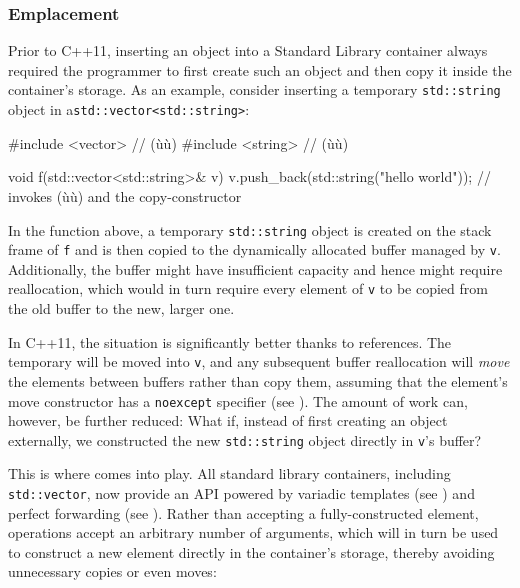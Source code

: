 \subsubsection[Emplacement]{Emplacement}\label{emplacement}

Prior to C++11, inserting an object into a Standard Library container
always required the programmer to first create such an object and then
copy it inside the container's storage. As an example, consider
inserting a temporary \lstinline!std::string! object in a\linebreak[4]
\mbox{\lstinline!std::vector<std::string>!}:

\begin{emcppshiddenlisting}[emcppsbatch=e11]
#include <vector>  // (ù{}ù)
#include <string>  // (ù{}ù)
\end{emcppshiddenlisting}
\begin{emcppslisting}[emcppsbatch=e11]
void f(std::vector<std::string>& v)
{
    v.push_back(std::string("hello world"));
        // invokes (ù{}ù) and the copy-constructor
}
\end{emcppslisting}

\noindent In the function above, a temporary \lstinline!std::string! object is
created on the stack frame of \lstinline!f! and is then copied to the
dynamically allocated buffer managed by \lstinline!v!. Additionally, the
buffer might have insufficient capacity and hence might require
reallocation, which would in turn require every element of \lstinline!v! to
be copied from the old buffer to the new, larger one.

In C++11, the situation is significantly better thanks to
 references. The temporary will be moved into
\lstinline!v!, and any subsequent buffer reallocation will \emph{move} the elements
between buffers rather than copy them, assuming that the element's
move constructor has a \lstinline!noexcept! specifier (see ). 
The amount of work
can, however, be further reduced: What if, instead of first creating
an object externally, we constructed the new \lstinline!std::string! object
directly in \lstinline!v!'s buffer?

This is where  comes into play. All standard library
containers, including \lstinline!std::vector!, now provide an
 API powered by variadic templates (see ) 
and perfect forwarding (see ). 
Rather than accepting a
fully-constructed element,  operations accept an
arbitrary number of arguments, which will in turn be used to construct a
new element directly in the container's storage, thereby avoiding
unnecessary copies or even moves:

